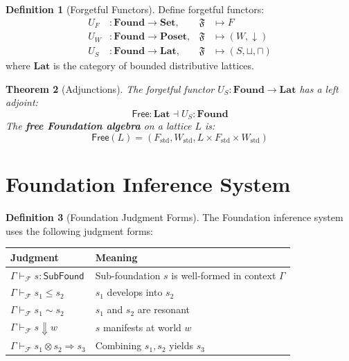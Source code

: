 \documentclass[11pt,twoside,openright]{book}
\theoremstyle{definition}
\newtheorem{definition}{Definition}[chapter]
\theoremstyle{plain}
\newtheorem{theorem}[definition]{Theorem}
\theoremstyle{remark}
\newcommand{\Foundations}{\mathcal{F}}
\begin{document}
\begin{definition}[Forgetful Functors]
\label{def:foundation-forgetful}
Define forgetful functors:
\begin{align*}
  U_F &: \mathbf{Found} \to \mathbf{Set}, & \mathfrak{F} &\mapsto F \\
  U_W &: \mathbf{Found} \to \mathbf{Poset}, & \mathfrak{F} &\mapsto (W, \downarrow) \\
  U_S &: \mathbf{Found} \to \mathbf{Lat}, & \mathfrak{F} &\mapsto (S, \sqcup, \sqcap)
\end{align*}
where $\mathbf{Lat}$ is the category of bounded distributive lattices.
\end{definition}

\begin{theorem}[Adjunctions]
\label{thm:foundation-adjunctions}
The forgetful functor $U_S : \mathbf{Found} \to \mathbf{Lat}$ has a left adjoint:
\[
\mathsf{Free} : \mathbf{Lat} \dashv U_S : \mathbf{Found}
\]
The \textbf{free Foundation algebra} on a lattice $L$ is:
\[
\mathsf{Free}(L) = (F_{\mathrm{std}}, W_{\mathrm{std}}, L \times F_{\mathrm{std}} \times W_{\mathrm{std}})
\]
\end{theorem}

\section{Foundation Inference System}
\label{sec:foundation-inference}

\begin{definition}[Foundation Judgment Forms]
\label{def:foundation-judgments}
The Foundation inference system uses the following judgment forms:
\begin{center}
\begin{tabular}{ll}
\toprule
\textbf{Judgment} & \textbf{Meaning} \\
\midrule
$\Gamma \vdash_\Foundations s : \mathsf{SubFound}$ & Sub-foundation $s$ is well-formed in context $\Gamma$ \\
$\Gamma \vdash_\Foundations s_1 \leq s_2$ & $s_1$ develops into $s_2$ \\
$\Gamma \vdash_\Foundations s_1 \sim s_2$ & $s_1$ and $s_2$ are resonant \\
$\Gamma \vdash_\Foundations s \Downarrow w$ & $s$ manifests at world $w$ \\
$\Gamma \vdash_\Foundations s_1 \otimes s_2 \Rightarrow s_3$ & Combining $s_1, s_2$ yields $s_3$ \\
\bottomrule
\end{tabular}
\end{center}
\end{definition}
\end{document}
